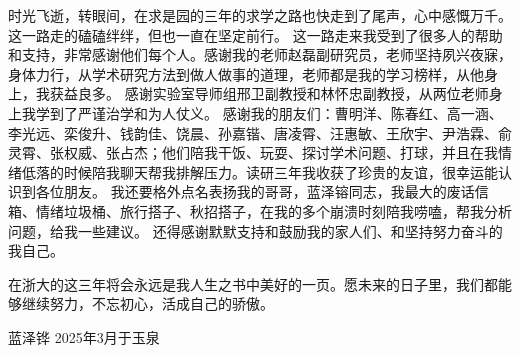 \cleardoublepage
{}
时光飞逝，转眼间，在求是园的三年的求学之路也快走到了尾声，心中感慨万千。这一路走的磕磕绊绊，但也一直在坚定前行。
这一路走来我受到了很多人的帮助和支持，非常感谢他们每个人。感谢我的老师赵磊副研究员，老师坚持夙兴夜寐，身体力行，从学术研究方法到做人做事的道理，老师都是我的学习榜样，从他身上，我获益良多。
感谢实验室导师组邢卫副教授和林怀忠副教授，从两位老师身上我学到了严谨治学和为人仗义。
感谢我的朋友们：曹明洋、陈春红、高一涵、李光远、栾俊升、钱韵佳、饶晨、孙嘉锴、唐凌霄、汪惠敏、王欣宇、尹浩霖、俞灵霄、张权威、张占杰；他们陪我干饭、玩耍、探讨学术问题、打球，并且在我情绪低落的时候陪我聊天帮我排解压力。读研三年我收获了珍贵的友谊，很幸运能认识到各位朋友。
我还要格外点名表扬我的哥哥，蓝泽镕同志，我最大的废话信箱、情绪垃圾桶、旅行搭子、秋招搭子，在我的多个崩溃时刻陪我唠嗑，帮我分析问题，给我一些建议。
还得感谢默默支持和鼓励我的家人们、和坚持努力奋斗的我自己。
\par 在浙大的这三年将会永远是我人生之书中美好的一页。愿未来的日子里，我们都能够继续努力，不忘初心，活成自己的骄傲。
\begin{flushright}
    蓝泽铧 2025年3月于玉泉
\end{flushright}